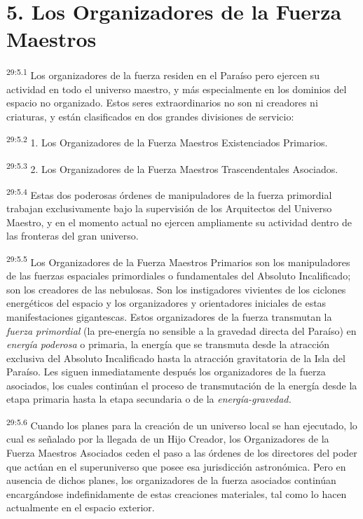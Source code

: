 \section*{5. Los Organizadores de la Fuerza Maestros}
\par
\textsuperscript{29:5.1} Los organizadores de la fuerza residen en el Paraíso pero ejercen su actividad en todo el universo maestro, y más especialmente en los dominios del espacio no organizado. Estos seres extraordinarios no son ni creadores ni criaturas, y están clasificados en dos grandes divisiones de servicio:

\par
\textsuperscript{29:5.2} 1. Los Organizadores de la Fuerza Maestros Existenciados Primarios.

\par
\textsuperscript{29:5.3} 2. Los Organizadores de la Fuerza Maestros Trascendentales Asociados.

\par
\textsuperscript{29:5.4} Estas dos poderosas órdenes de manipuladores de la fuerza primordial trabajan exclusivamente bajo la supervisión de los Arquitectos del Universo Maestro, y en el momento actual no ejercen ampliamente su actividad dentro de las fronteras del gran universo.

\par
\textsuperscript{29:5.5} Los Organizadores de la Fuerza Maestros Primarios son los manipuladores de las fuerzas espaciales primordiales o fundamentales del Absoluto Incalificado; son los creadores de las nebulosas. Son los instigadores vivientes de los ciclones energéticos del espacio y los organizadores y orientadores iniciales de estas manifestaciones gigantescas. Estos organizadores de la fuerza transmutan la \textit{fuerza primordial} (la pre-energía no sensible a la gravedad directa del Paraíso) en \textit{energía poderosa} o primaria, la energía que se transmuta desde la atracción exclusiva del Absoluto Incalificado hasta la atracción gravitatoria de la Isla del Paraíso. Les siguen inmediatamente después los organizadores de la fuerza asociados, los cuales continúan el proceso de transmutación de la energía desde la etapa primaria hasta la etapa secundaria o de la \textit{energía-gravedad.}

\par
\textsuperscript{29:5.6} Cuando los planes para la creación de un universo local se han ejecutado, lo cual es señalado por la llegada de un Hijo Creador, los Organizadores de la Fuerza Maestros Asociados ceden el paso a las órdenes de los directores del poder que actúan en el superuniverso que posee esa jurisdicción astronómica. Pero en ausencia de dichos planes, los organizadores de la fuerza asociados continúan encargándose indefinidamente de estas creaciones materiales, tal como lo hacen actualmente en el espacio exterior.

